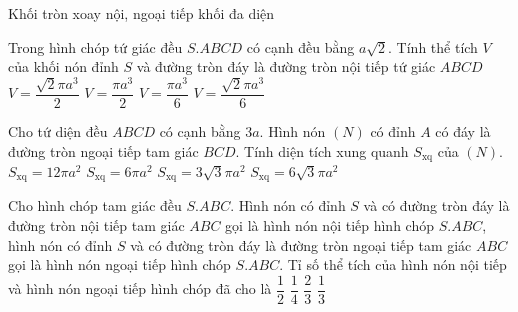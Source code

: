 \begin{dang}
	{Khối tròn xoay nội, ngoại tiếp khối đa diện}
\end{dang}    
\begin{ex}
	[Mã 123 2017]%
	Trong hình chóp tứ giác đều $S.ABCD$ có cạnh đều bằng $a\sqrt{2}$. Tính thể tích $V$ của khối nón đỉnh $S$ và đường tròn đáy là đường tròn nội tiếp tứ giác $ABCD$ 
	\choice
	{$V=\dfrac{\sqrt{2}\pi a^3}{2}$}
	{$V=\dfrac{\pi a^3}{2}$}
	{\True $V=\dfrac{\pi a^3}{6}$}
	{$V=\dfrac{\sqrt{2}\pi a^3}{6}$}
\end{ex}
\begin{ex}
	[Mã 110 2017]%
	Cho tứ diện đều $ABCD$ có cạnh bằng $3a$. Hình nón $(N)$ có đỉnh $A$ có đáy là đường tròn ngoại tiếp tam giác $BCD$. Tính diện tích xung quanh $S_{\mathrm{xq}}$ của $(N)$. 
	\choice
	{$S_{\mathrm{xq}}=12\pi a^2$}
	{$S_{\mathrm{xq}}=6\pi a^2$}
	{\True $S_{\mathrm{xq}}=3\sqrt{3}\pi a^2$}
	{$S_{\mathrm{xq}}=6\sqrt{3}\pi a^2$}
\end{ex}
\begin{ex}
	Cho hình chóp tam giác đều $S.ABC$. Hình nón có đỉnh $S$ và có đường tròn đáy là đường tròn nội tiếp tam giác $ABC$ gọi là hình nón nội tiếp hình chóp $S.ABC$, hình nón có đỉnh $S$ và có đường tròn đáy là đường tròn ngoại tiếp tam giác $ABC$ gọi là hình nón ngoại tiếp hình chóp $S.ABC$. Tỉ số thể tích của hình nón nội tiếp và hình nón ngoại tiếp hình chóp đã cho là
	\choice
	{$\dfrac{1}{2}$}
	{\True $\dfrac{1}{4}$}
	{$\dfrac{2}{3}$}
	{$\dfrac{1}{3}$}
\end{ex}
